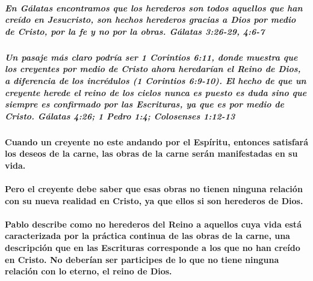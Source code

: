 \documentclass[11a pt,twoside]{article}
\let\oldparagraph\paragraph
\renewcommand{\paragraph}{\needspace{3\baselineskip}\oldparagraph}
\let\oldsubparagraph\subparagraph
\renewcommand{\subparagraph}{\needspace{2\baselineskip}\oldsubparagraph}
\begin{document}
\subparagraph{En Gálatas encontramos que los herederos son todos
aquellos que han creído en Jesucristo, son hechos herederos gracias a
Dios por medio de Cristo, por la fe y no por la obras. Gálatas 3:26-29,
4:6-7}\label{en-guxe1latas-encontramos-que-los-herederos-son-todos-aquellos-que-han-creuxeddo-en-jesucristo-son-hechos-herederos-gracias-a-dios-por-medio-de-cristo-por-la-fe-y-no-por-la-obras.-guxe1latas-326-29-46-7}

\subparagraph{Un pasaje más claro podría ser 1 Corintios 6:11, donde
muestra que los creyentes por medio de Cristo ahora heredarían el Reino
de Dios, a diferencia de los incrédulos (1 Corintios 6:9-10). El hecho
de que un creyente herede el reino de los cielos nunca es puesto es duda
sino que siempre es confirmado por las Escrituras, ya que es por medio
de Cristo. Gálatas 4:26; 1 Pedro 1:4; Colosenses
1:12-13}\label{un-pasaje-muxe1s-claro-podruxeda-ser-1-corintios-611-donde-muestra-que-los-creyentes-por-medio-de-cristo-ahora-heredaruxedan-el-reino-de-dios-a-diferencia-de-los-incruxe9dulos-1-corintios-69-10.-el-hecho-de-que-un-creyente-herede-el-reino-de-los-cielos-nunca-es-puesto-es-duda-sino-que-siempre-es-confirmado-por-las-escrituras-ya-que-es-por-medio-de-cristo.-guxe1latas-426-1-pedro-14-colosenses-112-13}

\paragraph{Cuando un creyente no este andando por el Espíritu, entonces
satisfará los deseos de la carne, las obras de la carne serán
manifestadas en su
vida.}\label{cuando-un-creyente-no-este-andando-por-el-espuxedritu-entonces-satisfaruxe1-los-deseos-de-la-carne-las-obras-de-la-carne-seruxe1n-manifestadas-en-su-vida.}

\paragraph{Pero el creyente debe saber que esas obras no tienen ninguna
relación con su nueva realidad en Cristo, ya que ellos si son herederos
de
Dios.}\label{pero-el-creyente-debe-saber-que-esas-obras-no-tienen-ninguna-relaciuxf3n-con-su-nueva-realidad-en-cristo-ya-que-ellos-si-son-herederos-de-dios.}

\paragraph{Pablo describe como no herederos del Reino a aquellos cuya
vida está caracterizada por la práctica continua de las obras de la
carne, una descripción que en las Escrituras corresponde a los que no
han creído en Cristo. No deberían ser participes de lo que no tiene
ninguna relación con lo eterno, el reino de
Dios.}\label{pablo-describe-como-no-herederos-del-reino-a-aquellos-cuya-vida-estuxe1-caracterizada-por-la-pruxe1ctica-continua-de-las-obras-de-la-carne-una-descripciuxf3n-que-en-las-escrituras-corresponde-a-los-que-no-han-creuxeddo-en-cristo.-no-deberuxedan-ser-participes-de-lo-que-no-tiene-ninguna-relaciuxf3n-con-lo-eterno-el-reino-de-dios.}
\end{document}

